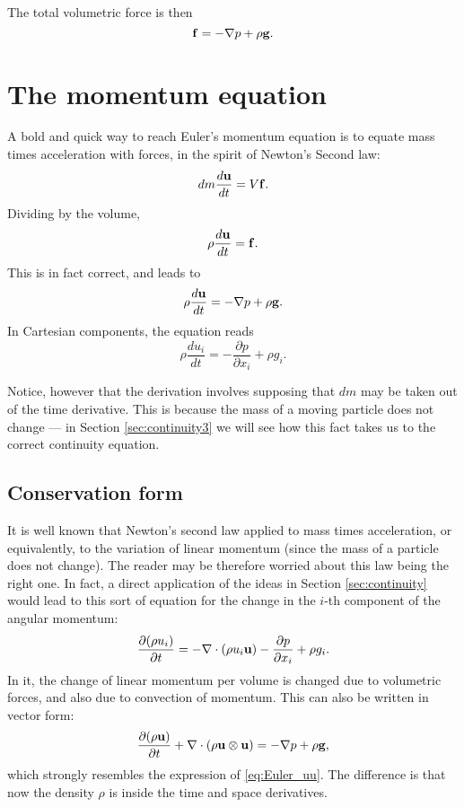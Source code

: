 The total volumetric force is then
\[
\mathbf{f} =  - \nabla p + \rho \mathbf{g} .
\]

\section{The momentum equation}

A bold and quick way to reach Euler's momentum equation is to equate
mass times acceleration with forces, in the spirit of Newton's Second
law:
\[
dm \frac{d\mathbf{u}}{dt} = V \mathbf{f} .
\]
Dividing by the volume,
\[
\rho \frac{d\mathbf{u}}{dt} = \mathbf{f} .
\]
This is in fact correct, and leads to
\begin{equation}
  \label{eq:Euler_momentum}
  \rho \frac{d\mathbf{u} }{dt} = - \nabla p + \rho \mathbf{g} .
\end{equation}
In Cartesian components, the equation reads
\begin{equation}
  \label{eq:Euler_momentum_C}
  \rho \frac{d u_i }{dt} =
  - \frac{\partial p} {\partial x_i} 
  + \rho g_i .
\end{equation}

Notice, however that the derivation involves supposing that $dm$ may
be taken out of the time derivative. This is because the mass of a
moving particle does not change --- in Section \ref{sec:continuity3}
we will see how this fact takes us to the correct continuity equation.

\subsection{Conservation form}

It is well known that Newton's second law applied to mass times
acceleration, or equivalently, to the variation of linear momentum
(since the mass of a particle does not change). The reader may be
therefore worried about this law being the right one.  In fact, a
direct application of the ideas in Section \ref{sec:continuity} would
lead to this sort of equation for the change in the $i$-th component
of the angular momentum:
\[
\frac{\partial (\rho u_i) } {\partial t} =
- \nabla \cdot  ( \rho u_i \mathbf{u} )
- \frac{\partial p} {\partial x_i} 
  + \rho g_i .
\]
In it, the change of linear momentum per volume is changed due to
volumetric forces, and also due to convection of momentum. This can
also be written in vector form:
\[
\frac{\partial  (\rho \mathbf{u} ) }{\partial t} +
\nabla \cdot ( \rho \mathbf{u} \otimes \mathbf{u} ) =
  - \nabla p 
  + \rho \mathbf{g} ,
\]
which strongly resembles the expression of \ref{eq:Euler_uu}. The
difference is that now the density $\rho$ is inside the time and
space derivatives.

